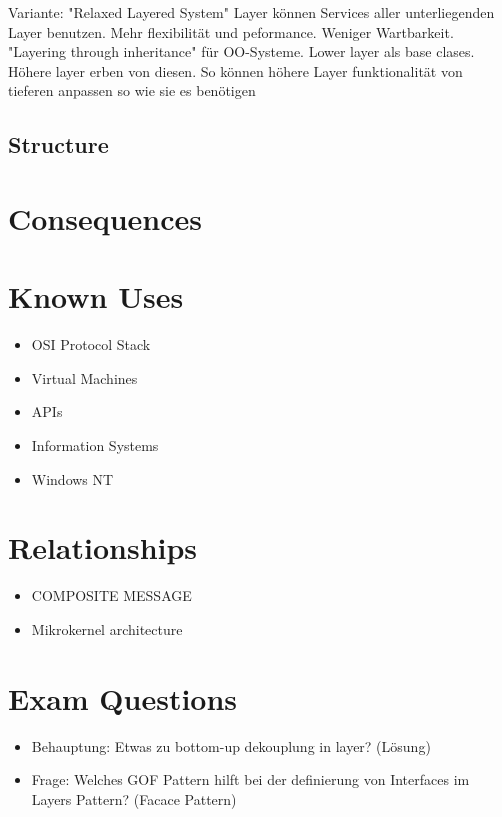 Variante: "Relaxed Layered System" Layer können Services aller unterliegenden Layer benutzen. Mehr flexibilität und peformance. Weniger Wartbarkeit.
"Layering through inheritance"  für OO-Systeme. Lower layer als base clases. Höhere layer erben von diesen. So können höhere Layer funktionalität von tieferen anpassen so wie sie es benötigen



\subsection{Structure}

%  

\section{Consequences}
\begin{itemize}
\end{itemize}

\section{Known Uses}
\begin{itemize}
	\item OSI Protocol Stack 
	\item Virtual Machines
	\item APIs
	\item Information Systems
	\item Windows NT
\end{itemize}

\section{Relationships}
\begin{itemize}
	\item COMPOSITE MESSAGE
	\item Mikrokernel architecture
\end{itemize}

\section{Exam Questions}
\begin{itemize}
  \item Behauptung: Etwas zu bottom-up dekouplung in layer? (Lösung)
    \item Frage: Welches GOF Pattern hilft bei der definierung von Interfaces im Layers Pattern? (Facace Pattern)
\end{itemize}
